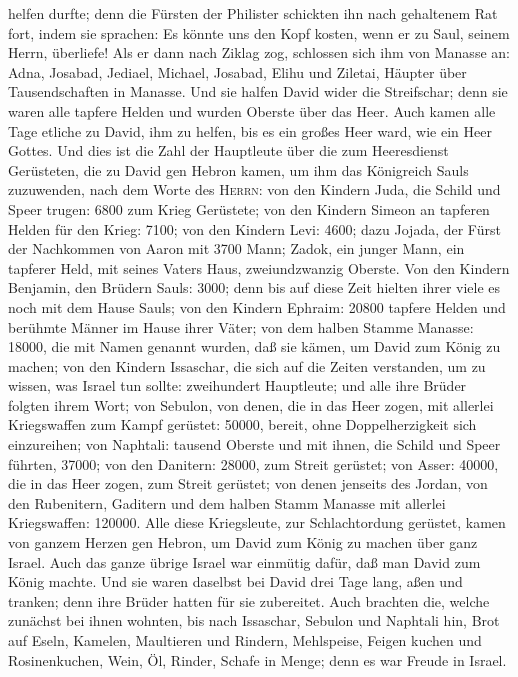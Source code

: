 helfen durfte; denn die Fürsten der Philister schickten ihn nach
gehaltenem Rat fort, indem sie sprachen: Es könnte uns den Kopf kosten,
wenn er zu Saul, seinem Herrn, überliefe!  Als er dann
nach Ziklag zog, schlossen sich ihm von Manasse an: Adna, Josabad,
Jediael, Michael, Josabad, Elihu und Ziletai, Häupter über
Tausendschaften in Manasse.  Und sie halfen David wider
die Streifschar; denn sie waren alle tapfere Helden und wurden Oberste
über das Heer.  Auch kamen alle Tage etliche zu David,
ihm zu helfen, bis es ein großes Heer ward, wie ein Heer Gottes.
 Und dies ist die Zahl der Hauptleute über die zum
Heeresdienst Gerüsteten, die zu David gen Hebron kamen, um ihm das
Königreich Sauls zuzuwenden, nach dem Worte des \textsc{Herrn}:
 von den Kindern Juda, die Schild und Speer trugen: 6800
zum Krieg Gerüstete;  von den Kindern Simeon an tapferen
Helden für den Krieg: 7100;  von den Kindern Levi: 4600;
 dazu Jojada, der Fürst der Nachkommen von Aaron mit 3700
Mann;  Zadok, ein junger Mann, ein tapferer Held, mit
seines Vaters Haus, zweiundzwanzig Oberste.  Von den
Kindern Benjamin, den Brüdern Sauls: 3000; denn bis auf diese Zeit
hielten ihrer viele es noch mit dem Hause Sauls;  von den
Kindern Ephraim: 20800 tapfere Helden und berühmte Männer im Hause ihrer
Väter;  von dem halben Stamme Manasse: 18000, die mit
Namen genannt wurden, daß sie kämen, um David zum König zu machen;
 von den Kindern Issaschar, die sich auf die Zeiten
verstanden, um zu wissen, was Israel tun sollte: zweihundert Hauptleute;
und alle ihre Brüder folgten ihrem Wort;  von Sebulon,
von denen, die in das Heer zogen, mit allerlei Kriegswaffen zum Kampf
gerüstet: 50000, bereit, ohne Doppelherzigkeit sich einzureihen;
 von Naphtali: tausend Oberste und mit ihnen, die Schild
und Speer führten, 37000;  von den Danitern: 28000, zum
Streit gerüstet;  von Asser: 40000, die in das Heer
zogen, zum Streit gerüstet;  von denen jenseits des
Jordan, von den Rubenitern, Gaditern und dem halben Stamm Manasse mit
allerlei Kriegswaffen: 120000.  Alle diese Kriegsleute,
zur Schlachtordung gerüstet, kamen von ganzem Herzen gen Hebron, um
David zum König zu machen über ganz Israel. Auch das ganze übrige Israel
war einmütig dafür, daß man David zum König machte.  Und
sie waren daselbst bei David drei Tage lang, aßen und tranken; denn ihre
Brüder hatten für sie zubereitet.  Auch brachten die,
welche zunächst bei ihnen wohnten, bis nach Issaschar, Sebulon und
Naphtali hin, Brot auf Eseln, Kamelen, Maultieren und Rindern,
Mehlspeise, Feigen kuchen und Rosinenkuchen, Wein, Öl, Rinder, Schafe in
Menge; denn es war Freude in Israel.

